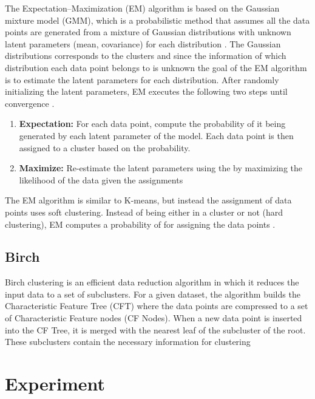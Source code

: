 \documentclass[12pt,english]{article}
\begin{document}
The Expectation–Maximization (EM) algorithm is based on the Gaussian mixture model (GMM), which is a probabilistic method that assumes all the data points are generated from a mixture of Gaussian distributions with unknown latent parameters (mean, covariance) for each distribution \cite{scikit-learn}. The Gaussian distributions corresponds to the clusters and since the information of which distribution each data point belongs to is unknown the goal of the EM algorithm is to estimate the latent parameters for each distribution. After randomly initializing the latent parameters, EM executes the following two steps until convergence \cite{scikit-learn}.

\begin{enumerate}
\item \textbf{Expectation: } For each data point, compute the probability of it being generated by each latent parameter of the model. Each data point is then assigned to a cluster based on the probability.

\item \textbf{Maximize: } Re-estimate the latent parameters using the by maximizing the likelihood of the data given the assignments 

\end{enumerate}

The EM algorithm is similar to K-means, but instead the assignment of data points uses soft clustering. Instead of being either in a cluster or not (hard clustering), EM computes a probability of for assigning the data points \cite{ncbi}.

\subsection{Birch}

\quad
Birch clustering is an efficient data reduction algorithm in which it reduces the input data to a set of subclusters. For a given dataset, the algorithm builds the Characteristic Feature Tree (CFT) where the data points are compressed to a set of  Characteristic Feature nodes (CF Nodes). When a new data point is inserted into the CF Tree, it is merged with the nearest leaf of the subcluster of the root. These subclusters contain the necessary information for clustering \cite{scikit-learn}

\section{Experiment}
\label{experiment}
\end{document}

